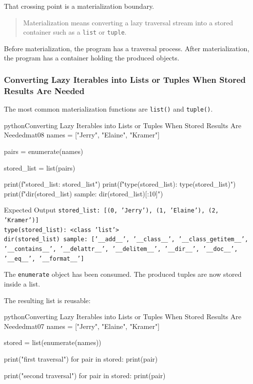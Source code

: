 \documentclass[a4paper,twoside]{report}
\begin{document}
That crossing point is a materialization boundary.

\begin{quote}
Materialization means converting a lazy traversal stream into a stored container such as a \texttt{list} or \texttt{tuple}.
\end{quote}

Before materialization, the program has a traversal process. After materialization, the program has a container holding the produced objects.

\subsubsection{Converting Lazy Iterables into Lists or Tuples When Stored Results Are Needed}

The most common materialization functions are \texttt{list()} and \texttt{tuple()}.

\begin{codebox}[]{python}{Converting Lazy Iterables into Lists or Tuples When Stored Results Are Needed}{mat08}
names = ["Jerry", "Elaine", "Kramer"]

pairs = enumerate(names)

stored_list = list(pairs)

print(f"stored_list: {stored_list}")
print(f"type(stored_list): {type(stored_list)}")
print(f"dir(stored_list) sample: {dir(stored_list)[:10]}")
\end{codebox}


\begin{iobox}{Expected Output}
\texttt{stored\_list: [(0, 'Jerry'), (1, 'Elaine'), (2, 'Kramer')]} \\
\texttt{type(stored\_list): <class 'list'>} \\
\texttt{dir(stored\_list) sample: ['\_\_add\_\_', '\_\_class\_\_', '\_\_class\_getitem\_\_',} \\
\texttt{'\_\_contains\_\_', '\_\_delattr\_\_', '\_\_delitem\_\_', '\_\_dir\_\_', '\_\_doc\_\_',} \\
\texttt{'\_\_eq\_\_', '\_\_format\_\_']} \\
\end{iobox}


The \texttt{enumerate} object has been consumed. The produced tuples are now stored inside a list.

The resulting list is reusable:

\begin{codebox}[]{python}{Converting Lazy Iterables into Lists or Tuples When Stored Results Are Needed}{mat07}
names = ["Jerry", "Elaine", "Kramer"]

stored = list(enumerate(names))

print("first traversal")
for pair in stored:
    print(pair)

print("second traversal")
for pair in stored:
    print(pair)
\end{codebox}
\end{document}
